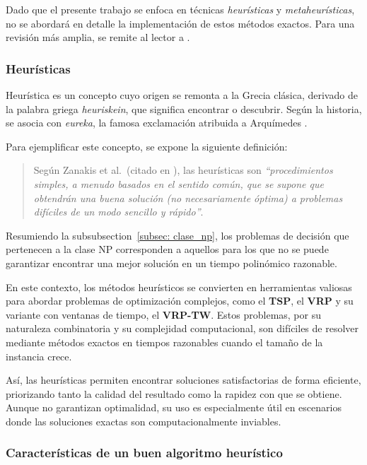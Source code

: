 \documentclass[12pt,titlepage,twoside,openright]{book}
\begin{document}
Dado que el presente trabajo se enfoca en técnicas \emph{heurísticas} y \emph{metaheurísticas}, no se abordará en detalle la implementación de estos métodos exactos. Para una revisión más amplia, se remite al lector a \citep{montes2017}.

\subsubsection{Heurísticas}

Heurística es un concepto cuyo origen se remonta a la Grecia clásica, derivado de la palabra griega \textit{heuriskein}, que significa encontrar o descubrir. Según la historia, se asocia con \textit{eureka}, la famosa exclamación atribuida a Arquímedes \citep{antonioSuarez2014}.

Para ejemplificar este concepto, se expone la siguiente definición:

\begin{quote}
	Según Zanakis et al.\ (citado en \citep{duarte2007metaheuristicas}), las heurísticas son \textit{``procedimientos simples, a menudo basados en el sentido común, que se supone que obtendrán una buena solución (no necesariamente óptima) a problemas difíciles de un modo sencillo y rápido''}.
\end{quote}



Resumiendo la subsubsection~\ref{subsec: clase_np}, los problemas de decisión que pertenecen a la clase NP corresponden a aquellos para los que no se puede garantizar encontrar una mejor solución en un tiempo polinómico razonable.

En este contexto, los métodos heurísticos se convierten en herramientas valiosas para abordar problemas de optimización complejos, como el \textbf{TSP}, el \textbf{VRP} y su variante con ventanas de tiempo, el \textbf{VRP-TW}. Estos problemas, por su naturaleza combinatoria y su complejidad computacional, son difíciles de resolver mediante métodos exactos en tiempos razonables cuando el tamaño de la instancia crece.

Así, las heurísticas permiten encontrar soluciones satisfactorias de forma eficiente, priorizando tanto la calidad del resultado como la rapidez con que se obtiene. Aunque no garantizan optimalidad, su uso es especialmente útil en escenarios donde las soluciones exactas son computacionalmente inviables.

\subsubsection*{Características de un buen algoritmo heurístico}
\end{document}
